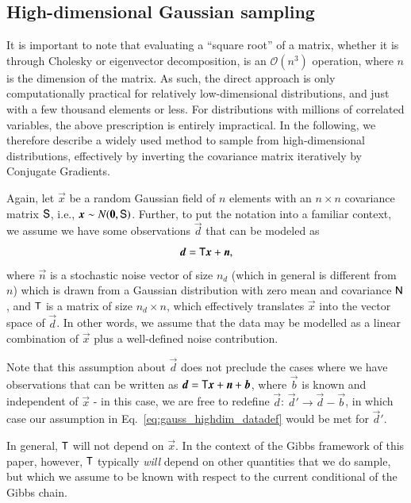 \documentclass[twocolumn]{aa}
\renewcommand{\d}[0]{\vec{d}}
\newcommand{\n}[0]{\vec{n}}
\newcommand{\x}[0]{\vec{x}}
\newcommand{\T}[0]{\tens{T}}
\renewcommand{\b}[0]{\vec{b}}
\newcommand{\N}[0]{\tens{N}}
\renewcommand{\S}[0]{\tens{S}}
\begin{document}
\subsection{High-dimensional Gaussian sampling}
\label{sec:gauss_highdim}

It is important to note that evaluating a ``square root'' of a matrix,
whether it is through Cholesky or eigenvector decomposition, is an
$\mathcal{O}(n^3)$ operation, where $n$ is the dimension of the
matrix. As such, the direct approach is only computationally
practical for relatively low-dimensional distributions, and just with
a few thousand elements or less. For distributions with millions of
correlated variables, the above prescription is entirely
impractical. In the following, we therefore describe a widely used
method to sample from high-dimensional distributions, effectively by
inverting the covariance matrix iteratively by Conjugate Gradients.

Again, let $\x$ be a random Gaussian field of $n$ elements with an
$n\times n$ covariance matrix $\S$, i.e., $\x \sim N(\vec 0,
\S)$. Further, to put the notation into a familiar context, we assume
we have some observations $\d$ that can be modeled as
\begin{equation}
    \d = \T\x + \n,
    \label{eq:gauss_highdim_datadef}
\end{equation}
where $\n$ is a stochastic noise vector of size $n_d$ (which in
general is different from $n$) which is drawn from a Gaussian
distribution with zero mean and covariance $\N$, and $\T$ is a matrix
of size $n_d\times n$, which effectively translates $\x$ into the
vector space of $\d$. In other words, we assume that the data may be
modelled as a linear combination of $\x$ plus a well-defined noise
contribution.

Note that this assumption about $\d$ does not preclude the cases where we have observations that can be written as $\d = \T\x + \n + \b$, where $\b$ is known and independent of $\x$ - in this case, we are free to redefine $\d$: $\d' \rightarrow \d - \b$, in which case our assumption in Eq.~\eqref{eq:gauss_highdim_datadef} would be met for $\d'$.

In general, $\T$ will not depend on $\x$. In the context of the Gibbs
framework of this paper, however, $\T$ typically \emph{will} depend on
other quantities that we do sample, but which we assume to be known
with respect to the current conditional of the Gibbs chain.
\end{document}
